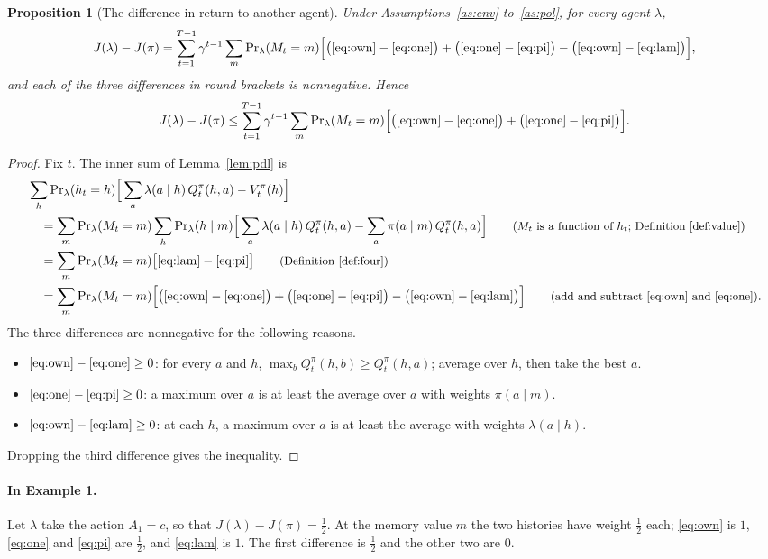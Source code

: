 \documentclass{article}
\newtheorem{proposition}{Proposition}[section]
\theoremstyle{definition}
\newcommand{\Prl}{\Pr\nolimits_{\lambda}}
\newcommand{\why}[1]{\tag*{\small(#1)}}
\begin{document}
\begin{proposition}[The difference in return to another agent]\label{prop:layer1}
Under Assumptions~\ref{as:env} to~\ref{as:pol}, for every agent $\lambda$,
\[
J(\lambda)-J(\pi)=\sum_{t=1}^{T-1}\gamma^{t-1}\sum_m\Prl (M_t=m)\Big[\big(\eqref{eq:own}-\eqref{eq:one}\big)+\big(\eqref{eq:one}-\eqref{eq:pi}\big)-\big(\eqref{eq:own}-\eqref{eq:lam}\big)\Big],
\]
and each of the three differences in round brackets is nonnegative. Hence
\[
J(\lambda)-J(\pi)\le\sum_{t=1}^{T-1}\gamma^{t-1}\sum_m\Prl (M_t=m)\Big[\big(\eqref{eq:own}-\eqref{eq:one}\big)+\big(\eqref{eq:one}-\eqref{eq:pi}\big)\Big].
\]
\end{proposition}

\begin{proof}
Fix $t$. The inner sum of Lemma~\ref{lem:pdl} is
\begin{align*}
&\sum_h\Prl (h_t=h)\Big[\sum_a\lambda(a\mid h)\,Q^\pi_t(h,a)-V^\pi_t(h)\Big]\\
&\quad=\sum_m\Prl (M_t=m)\sum_h\Prl (h\mid m)\Big[\sum_a\lambda(a\mid h)\,Q^\pi_t(h,a)-\sum_a\pi(a\mid m)\,Q^\pi_t(h,a)\Big] \why{$M_t$ is a function of $h_t$; Definition~\ref{def:value}}\\
&\quad=\sum_m\Prl (M_t=m)\big[\eqref{eq:lam}-\eqref{eq:pi}\big] \why{Definition~\ref{def:four}}\\
&\quad=\sum_m\Prl (M_t=m)\Big[\big(\eqref{eq:own}-\eqref{eq:one}\big)+\big(\eqref{eq:one}-\eqref{eq:pi}\big)-\big(\eqref{eq:own}-\eqref{eq:lam}\big)\Big] \why{add and subtract \eqref{eq:own} and \eqref{eq:one}}.
\end{align*}
The three differences are nonnegative for the following reasons.
\begin{itemize}
\item $\eqref{eq:own}-\eqref{eq:one}\ge0$: for every $a$ and $h$, $\max_bQ^\pi_t(h,b)\ge Q^\pi_t(h,a)$; average over $h$, then take the best $a$.
\item $\eqref{eq:one}-\eqref{eq:pi}\ge0$: a maximum over $a$ is at least the average over $a$ with weights $\pi(a\mid m)$.
\item $\eqref{eq:own}-\eqref{eq:lam}\ge0$: at each $h$, a maximum over $a$ is at least the average with weights $\lambda(a\mid h)$.
\end{itemize}
Dropping the third difference gives the inequality.
\end{proof}

\paragraph{In Example 1.} Let $\lambda$ take the action $A_1=c$, so that $J(\lambda)-J(\pi)=\tfrac12$. At the memory value $m$ the two histories have weight $\tfrac12$ each; \eqref{eq:own} is $1$, \eqref{eq:one} and \eqref{eq:pi} are $\tfrac12$, and \eqref{eq:lam} is $1$. The first difference is $\tfrac12$ and the other two are $0$.
\end{document}
